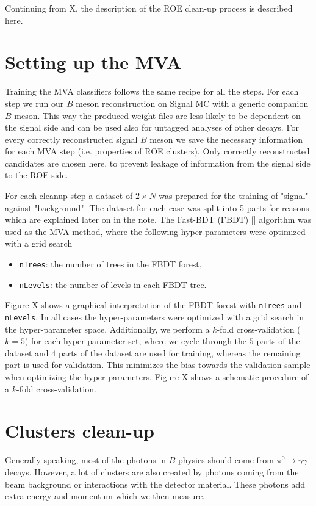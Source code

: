 \documentclass[oneside,a4paper,openany,12pt]{scrbook}
\begin{document}
Continuing from X, the description of the ROE clean-up process is described here. 

\section{Setting up the MVA}

Training the MVA classifiers follows the same recipe for all the steps. For each step we run our $B$ meson reconstruction on Signal MC with a generic companion $B$ meson. This way the produced weight files are less likely to be dependent on the signal side and can be used also for untagged analyses of other decays. For every correctly reconstructed signal $B$ meson we save the necessary information for each MVA step (i.e. properties of ROE clusters). Only correctly reconstructed candidates are chosen here, to prevent leakage of information from the signal side to the ROE side.

For each cleanup-step a dataset of $2\times N$ was prepared for the training of "signal" against "background". The dataset for each case was split into 5 parts for reasons which are explained later on in the note. The Fast-BDT (FBDT) [] algorithm was used as the MVA method, where the following hyper-parameters were optimized with a grid search
\begin{itemize}
\item \texttt{nTrees}: the number of trees in the FBDT forest,
\item \texttt{nLevels}: the number of levels in each FBDT tree.
\end{itemize}

Figure X shows a graphical interpretation of the FBDT forest with \texttt{nTrees} and \texttt{nLevels}. In all cases the hyper-parameters were optimized with a grid search in the hyper-parameter space. Additionally, we perform a $k$-fold cross-validation ($k=5$) for each hyper-parameter set, where we cycle through the $5$ parts of the dataset and $4$ parts of the dataset are used for training, whereas the remaining part is used for validation. This minimizes the bias towards the validation sample when optimizing the hyper-parameters. Figure X shows a schematic procedure of a $k$-fold cross-validation.

\section{Clusters clean-up}

Generally speaking, most of the photons in $B$-physics should come from $\pi^0 \to \gamma \gamma$ decays. However, a lot of clusters are also created by photons coming from the beam background or interactions with the detector material. These photons add extra energy and momentum which we then measure.
\end{document}
